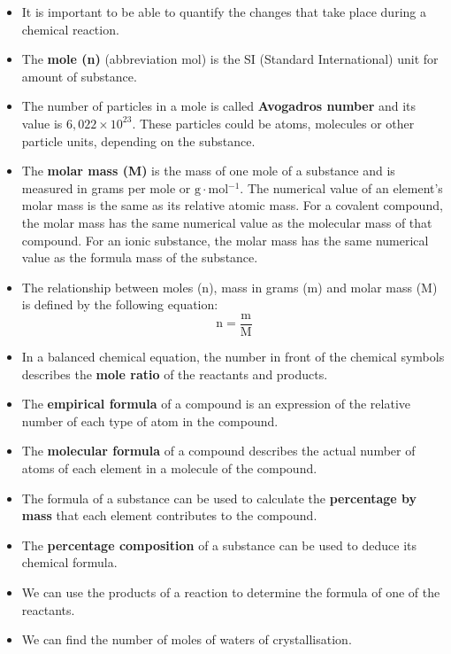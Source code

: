             \nopagebreak
      \label{m38712*id285735}\begin{itemize}[noitemsep]
\item It is important to be able to quantify the changes that take place during a chemical reaction.
\item The \textbf{mole (n)} (abbreviation mol) is the SI (Standard International) unit for amount of substance.
\item The number of particles in a mole is called \textbf{Avogadros number} and its value is $6,022 \times {10}^{23}$. These particles could be atoms, molecules or other particle units, depending on the substance.
\item The \textbf{molar mass (M)} is the mass of one mole of a substance and is measured in grams per mole or $\text{g} \cdot \text{mol}{}^{-1}$. The numerical value of an element's molar mass is the same as its relative atomic mass. For a covalent compound, the molar mass has the same numerical value as the molecular mass of that compound. For an ionic substance, the molar mass has the same numerical value as the formula mass of the substance.
\item The relationship between moles (n), mass in grams (m) and molar mass (M) is defined by the following equation:
\label{m38712*id285862}\nopagebreak\noindent{}
    \begin{equation*}
    \text{n}=\frac{\text{m}}{\text{M}}
      \end{equation*}
\item In a balanced chemical equation, the number in front of the chemical symbols describes the \textbf{mole ratio} of the reactants and products.
\item The \textbf{empirical formula} of a compound is an expression of the relative number of each type of atom in the compound.
\item The \textbf{molecular formula} of a compound describes the actual number of atoms of each element in a molecule of the compound.
\item The formula of a substance can be used to calculate the \textbf{percentage by mass} that each element contributes to the compound.
\item The \textbf{percentage composition} of a substance can be used to deduce its chemical formula.
\item We can use the products of a reaction to determine the formula of one of the reactants. 
\item We can find the number of moles of waters of crystallisation.

\end{itemize}
